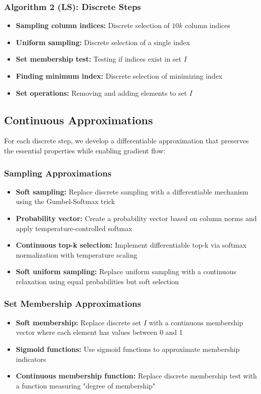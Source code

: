 \documentclass{article}
\begin{document}
\subsubsection{Algorithm 2 (LS): Discrete Steps}
\begin{itemize}
    \item \textbf{Sampling column indices:} Discrete selection of $10k$ column indices
    \item \textbf{Uniform sampling:} Discrete selection of a single index
    \item \textbf{Set membership test:} Testing if indices exist in set $I$
    \item \textbf{Finding minimum index:} Discrete selection of minimizing index
    \item \textbf{Set operations:} Removing and adding elements to set $I$
\end{itemize}

\subsection{Continuous Approximations}
For each discrete step, we develop a differentiable approximation that preserves the essential properties while enabling gradient flow:

\subsubsection{Sampling Approximations}
\begin{itemize}
    \item \textbf{Soft sampling:} Replace discrete sampling with a differentiable mechanism using the Gumbel-Softmax trick
    \item \textbf{Probability vector:} Create a probability vector based on column norms and apply temperature-controlled softmax
    \item \textbf{Continuous top-k selection:} Implement differentiable top-k via softmax normalization with temperature scaling
    \item \textbf{Soft uniform sampling:} Replace uniform sampling with a continuous relaxation using equal probabilities but soft selection
\end{itemize}

\subsubsection{Set Membership Approximations}
\begin{itemize}
    \item \textbf{Soft membership:} Replace discrete set $I$ with a continuous membership vector where each element has values between 0 and 1
    \item \textbf{Sigmoid functions:} Use sigmoid functions to approximate membership indicators
    \item \textbf{Continuous membership function:} Replace discrete membership test with a function measuring "degree of membership"
\end{itemize}
\end{document}

